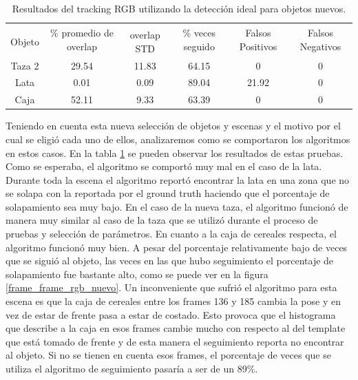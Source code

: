 \begin{table}
    \begin{tabular}{|c|c|c|c|c|c|}
    \hline
    & \multirow{2}{2.4cm}{\% promedio de overlap} & & \multirow{2}{2cm}{\% veces seguido} & \multirow{2}{1.6cm}{Falsos Positivos} & \multirow{2}{1.6cm}{Falsos Negativos}\\
	Objeto & & overlap STD & & &\\
    \hline
    Taza 2  & 29.54      & 11.83       & 64.15             & 0                & 0\\
    \hline
    Lata    &  0.01      &  0.09       & 89.04             & 21.92            & 0\\
    \hline
    Caja    & 52.11      &  9.33       & 63.39             & 0                & 0\\
    \hline
    \end{tabular}
\caption{Resultados del tracking RGB utilizando la detección ideal para objetos nuevos.}
\label{tabla_rgb_nuevos}
\end{table}


Teniendo en cuenta esta nueva selección de objetos y escenas y el motivo por el cual se eligió cada uno de ellos, analizaremos como se comportaron los algoritmos en estos casos. En la tabla \ref{tabla_rgb_nuevos} se pueden observar los resultados de estas pruebas. Como se esperaba, el algoritmo se comportó muy mal en el caso de la lata. Durante toda la escena el algoritmo reportó encontrar la lata en una zona que no se solapa con la reportada por el ground truth haciendo que el porcentaje de solapamiento sea muy bajo. En el caso de la nueva taza, el algoritmo funcionó de manera muy similar al caso de la taza que se utilizó durante el proceso de pruebas y selección de parámetros. En cuanto a la caja de cereales respecta, el algoritmo funcionó muy bien. A pesar del porcentaje relativamente bajo de veces que se siguió al objeto, las veces en las que hubo seguimiento el porcentaje de solapamiento fue bastante alto, como se puede ver en la figura \ref{frame_frame_rgb_nuevo}. Un inconveniente que sufrió el algoritmo para esta escena es que la caja de cereales entre los frames 136 y 185 cambia la pose y en vez de estar de frente pasa a estar de costado. Esto provoca que el histograma que describe a la caja en esos frames cambie mucho con respecto al del template que está tomado de frente y de esta manera el seguimiento reporta no encontrar al objeto. Si no se tienen en cuenta esos frames, el porcentaje de veces que se utiliza el algoritmo de seguimiento pasaría a ser de un 89\%.

